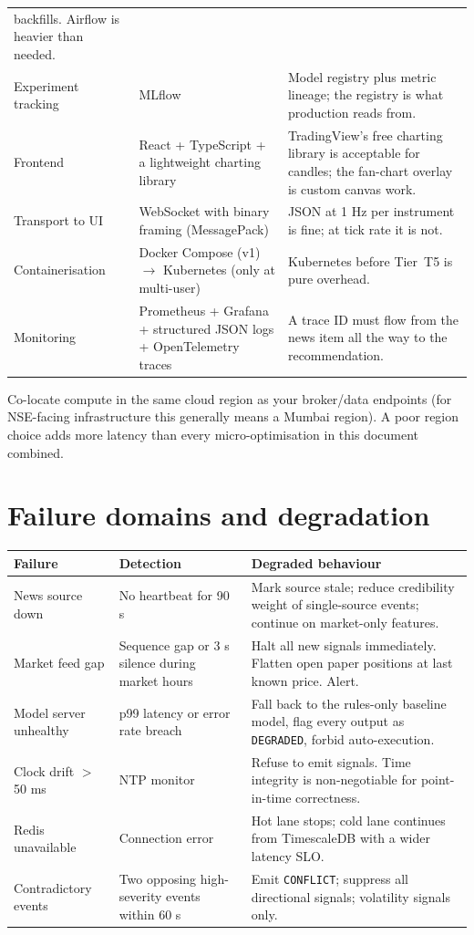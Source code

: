\begin{longtable}{@{}p{3.0cm}p{4.0cm}p{7.4cm}@{}}
backfills. Airflow is heavier than needed.\\
Experiment tracking & MLflow & Model registry plus metric lineage; the registry
is what production reads from.\\
Frontend & React + TypeScript + a lightweight charting library & TradingView's
free charting library is acceptable for candles; the fan-chart overlay is custom
canvas work.\\
Transport to UI & WebSocket with binary framing (MessagePack) & JSON at 1 Hz per
instrument is fine; at tick rate it is not.\\
Containerisation & Docker Compose (v1) $\to$ Kubernetes (only at multi-user) &
Kubernetes before Tier~T5 is pure overhead.\\
Monitoring & Prometheus + Grafana + structured JSON logs + OpenTelemetry traces
& A trace ID must flow from the news item all the way to the recommendation.\\
\bottomrule
\end{longtable}

\begin{warnbox}[title={Deployment location matters more than framework choice}]
Co-locate compute in the same cloud region as your broker/data endpoints
(for NSE-facing infrastructure this generally means a Mumbai region). A poor
region choice adds more latency than every micro-optimisation in this document
combined.
\end{warnbox}

\section{Failure domains and degradation}

\begin{longtable}{@{}p{3.8cm}p{4.2cm}p{6.4cm}@{}}
\toprule
\textbf{Failure} & \textbf{Detection} & \textbf{Degraded behaviour}\\
\midrule
News source down & No heartbeat for 90 s & Mark source stale; reduce credibility
weight of single-source events; continue on market-only features.\\
Market feed gap & Sequence gap or 3 s silence during market hours & Halt all new
signals immediately. Flatten open paper positions at last known price. Alert.\\
Model server unhealthy & p99 latency or error rate breach & Fall back to the
rules-only baseline model, flag every output as \texttt{DEGRADED}, forbid
auto-execution.\\
Clock drift $>$ 50 ms & NTP monitor & Refuse to emit signals. Time integrity is
non-negotiable for point-in-time correctness.\\
Redis unavailable & Connection error & Hot lane stops; cold lane continues from
TimescaleDB with a wider latency SLO.\\
Contradictory events & Two opposing high-severity events within 60 s & Emit
\texttt{CONFLICT}; suppress all directional signals; volatility signals only.\\
\bottomrule
\end{longtable}

